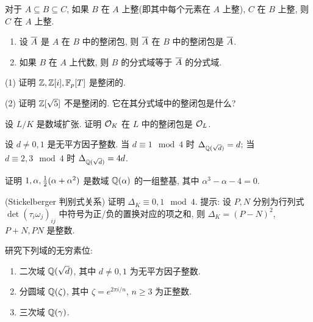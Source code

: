 \begin{exercise}
  对于 $A\subseteq B\subseteq C$, 如果 $B$ 在 $A$ 上整(即其中每个元素在 $A$ 上整), $C$ 在 $B$ 上整, 则 $C$ 在 $A$ 上整. 
  \end{exercise}
  
  \begin{exercise}
    \begin{enumerate}
      \item 设 $\overline A$ 是 $A$ 在 $B$ 中的整闭包, 则 $\overline A$ 在 $B$ 中的整闭包是 $\overline A$.
      \item 如果 $B$ 在 $A$ 上代数, 则 $B$ 的分式域等于 $\overline A$ 的分式域.
    \end{enumerate}
  \end{exercise}
  
\begin{exercise}
(1) 证明 ${\mathbb{Z}},{\mathbb{Z}}[i],{\mathbb{F}}_p[T]$ 是整闭的. 

(2) 证明 ${\mathbb{Z}}[\sqrt{5}]$ 不是整闭的. 它在其分式域中的整闭包是什么?
\end{exercise}

\begin{exercise}
设 $L/K$ 是数域扩张. 证明 ${\mathcal{O}}_K$ 在 $L$ 中的整闭包是 ${\mathcal{O}}_L$.
\end{exercise}

\begin{exercise}
设 $d\neq 0,1$ 是无平方因子整数. 当 $d\equiv 1\mod 4$ 时 $\Delta_{{\mathbb{Q}}(\sqrt{d})}=d$; 当 $d\equiv 2,3\mod 4$ 时 $\Delta_{{\mathbb{Q}}(\sqrt{d})}=4d$.
\end{exercise}

\begin{exercise}
证明 $1,\alpha,\frac{1}{2}(\alpha+\alpha^2)$ 是数域 ${\mathbb{Q}}(\alpha)$ 的一组整基, 其中 $\alpha^3-\alpha-4=0$.
\end{exercise}

\begin{exercise}
(Stickelberger 判别式关系) 证明 $\Delta_K\equiv 0,1\mod 4$. 提示: 设 $P,N$ 分别为行列式 $\det(\tau_i\omega_j)_{ij}$ 中符号为正/负的置换对应的项之和, 则 $\Delta_K=(P-N)^2$, $P+N,PN$ 是整数.
\end{exercise}

\begin{exercise}
研究下列域的无穷素位: 
\begin{enumerate}
\item 二次域 ${\mathbb{Q}}(\sqrt{d})$, 其中 $d\neq 0,1$ 为无平方因子整数.
\item 分圆域 ${\mathbb{Q}}(\zeta)$, 其中 $\zeta=e^{2\pi i/n}$, $n\ge 3$ 为正整数.
\item 三次域 ${\mathbb{Q}}(\gamma)$.
\end{enumerate}
\end{exercise}

